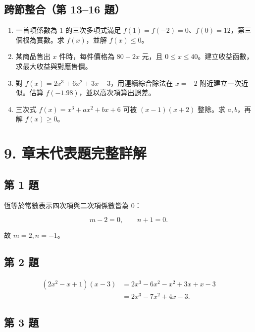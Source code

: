 \documentclass[11pt,a4paper]{article}
\providecommand{\tightlist}{%
  \setlength{\itemsep}{0pt}\setlength{\parskip}{0pt}}
\begin{document}
\subsection{跨節整合（第 13--16 題）}\label{ux8de8ux7bc0ux6574ux5408ux7b2c-1316-ux984c}

\begin{enumerate}
\def\labelenumi{\arabic{enumi}.}
\setcounter{enumi}{12}
\tightlist
\item
  一首項係數為 \(1\) 的三次多項式滿足 \(f(1)=f(-2)=0\)、\(f(0)=12\)，第三個根為實數。求 \(f(x)\)，並解 \(f(x)\le0\)。
\item
  某商品售出 \(x\) 件時，每件價格為 \(80-2x\) 元，且 \(0\le x\le40\)。建立收益函數，求最大收益與對應售價。
\item
  對 \(f(x)=2x^3+6x^2+3x-3\)，用連續綜合除法在 \(x=-2\) 附近建立一次近似。估算 \(f(-1.98)\)，並以高次項算出誤差。
\item
  三次式 \(f(x)=x^3+ax^2+bx+6\) 可被 \((x-1)(x+2)\) 整除。求 \(a,b\)，再解 \(f(x)\ge0\)。
\end{enumerate}

\section{9. 章末代表題完整詳解}\label{ux7ae0ux672bux4ee3ux8868ux984cux5b8cux6574ux8a73ux89e3}

\subsection{第 1 題}\label{ux7b2c-1-ux984c}

恆等於常數表示四次項與二次項係數皆為 \(0\)：

\[
m-2=0,\qquad n+1=0.
\]

故 \(\boxed{m=2,n=-1}\)。

\subsection{第 2 題}\label{ux7b2c-2-ux984c}

\[
\begin{aligned}
(2x^2-x+1)(x-3)
&=2x^3-6x^2-x^2+3x+x-3\\
&=\boxed{2x^3-7x^2+4x-3}.
\end{aligned}
\]

\subsection{第 3 題}\label{ux7b2c-3-ux984c}
\end{document}
